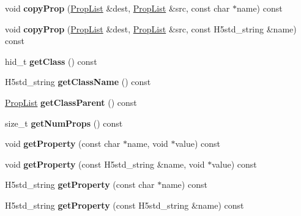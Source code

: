 \begin{DoxyCompactItemize}
void {\bfseries copy\+Prop} (\hyperlink{class_h5_1_1_prop_list}{Prop\+List} \&dest, \hyperlink{class_h5_1_1_prop_list}{Prop\+List} \&src, const char $\ast$name) const
\item 
\mbox{\label{class_h5_1_1_prop_list_a05892b5cbc5cab1ec5dbf1f263f46548}} 
void {\bfseries copy\+Prop} (\hyperlink{class_h5_1_1_prop_list}{Prop\+List} \&dest, \hyperlink{class_h5_1_1_prop_list}{Prop\+List} \&src, const H5std\+\_\+string \&name) const
\item 
\mbox{\label{class_h5_1_1_prop_list_ae4cf63b854925035ef4a9b7fa0471ad3}} 
hid\+\_\+t {\bfseries get\+Class} () const
\item 
\mbox{\label{class_h5_1_1_prop_list_a8cb8c8e41e9a05b03af645e214bd6558}} 
H5std\+\_\+string {\bfseries get\+Class\+Name} () const
\item 
\mbox{\label{class_h5_1_1_prop_list_a87d1efaf7cccb7c30d226fe08f5d8b38}} 
\hyperlink{class_h5_1_1_prop_list}{Prop\+List} {\bfseries get\+Class\+Parent} () const
\item 
\mbox{\label{class_h5_1_1_prop_list_ab867a16c065644d23abc9c187c076bbb}} 
size\+\_\+t {\bfseries get\+Num\+Props} () const
\item 
\mbox{\label{class_h5_1_1_prop_list_aa01537018b3bbf7faa4134ff484a6d65}} 
void {\bfseries get\+Property} (const char $\ast$name, void $\ast$value) const
\item 
\mbox{\label{class_h5_1_1_prop_list_a4c477941aedbb77e8f68de269f1454bb}} 
void {\bfseries get\+Property} (const H5std\+\_\+string \&name, void $\ast$value) const
\item 
\mbox{\label{class_h5_1_1_prop_list_ab36748dccc9f28e39488b71d848b2d57}} 
H5std\+\_\+string {\bfseries get\+Property} (const char $\ast$name) const
\item 
\mbox{\label{class_h5_1_1_prop_list_ab72b258fca43899124c23be43061c9de}} 
H5std\+\_\+string {\bfseries get\+Property} (const H5std\+\_\+string \&name) const

\end{DoxyCompactItemize}
